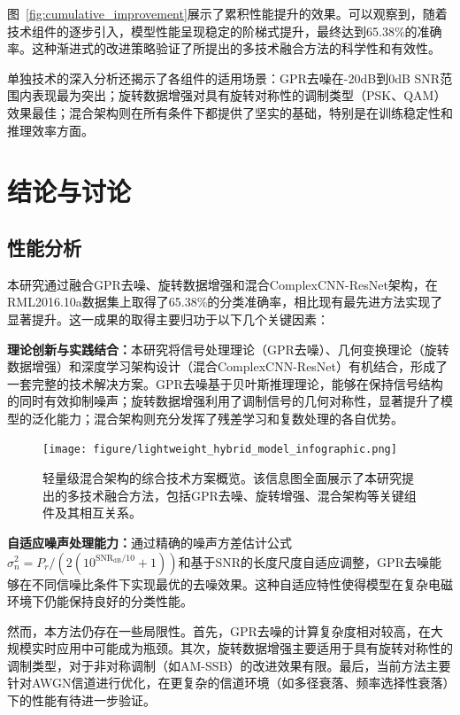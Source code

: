 \documentclass[conference]{IEEEtran}
\begin{document}
图~\ref{fig:cumulative_improvement}展示了累积性能提升的效果。可以观察到，随着技术组件的逐步引入，模型性能呈现稳定的阶梯式提升，最终达到65.38\%的准确率。这种渐进式的改进策略验证了所提出的多技术融合方法的科学性和有效性。

单独技术的深入分析还揭示了各组件的适用场景：GPR去噪在-20dB到0dB SNR范围内表现最为突出；旋转数据增强对具有旋转对称性的调制类型（PSK、QAM）效果最佳；混合架构则在所有条件下都提供了坚实的基础，特别是在训练稳定性和推理效率方面。

\section{结论与讨论}

\subsection{性能分析}

本研究通过融合GPR去噪、旋转数据增强和混合ComplexCNN-ResNet架构，在RML2016.10a数据集上取得了65.38\%的分类准确率，相比现有最先进方法实现了显著提升。这一成果的取得主要归功于以下几个关键因素：

\textbf{理论创新与实践结合：}本研究将信号处理理论（GPR去噪）、几何变换理论（旋转数据增强）和深度学习架构设计（混合ComplexCNN-ResNet）有机结合，形成了一套完整的技术解决方案。GPR去噪基于贝叶斯推理理论，能够在保持信号结构的同时有效抑制噪声；旋转数据增强利用了调制信号的几何对称性，显著提升了模型的泛化能力；混合架构则充分发挥了残差学习和复数处理的各自优势。

\begin{figure}[htbp]
\centering
\texttt{[image: figure/lightweight\_hybrid\_model\_infographic.png]}
\caption{轻量级混合架构的综合技术方案概览。该信息图全面展示了本研究提出的多技术融合方法，包括GPR去噪、旋转增强、混合架构等关键组件及其相互关系。}
\label{fig:comprehensive_overview}
\end{figure}

\textbf{自适应噪声处理能力：}通过精确的噪声方差估计公式$\sigma_n^2 = P_r/(2(10^{\mathrm{SNR}_{\mathrm{dB}}/10} + 1))$和基于SNR的长度尺度自适应调整，GPR去噪能够在不同信噪比条件下实现最优的去噪效果。这种自适应特性使得模型在复杂电磁环境下仍能保持良好的分类性能。

然而，本方法仍存在一些局限性。首先，GPR去噪的计算复杂度相对较高，在大规模实时应用中可能成为瓶颈。其次，旋转数据增强主要适用于具有旋转对称性的调制类型，对于非对称调制（如AM-SSB）的改进效果有限。最后，当前方法主要针对AWGN信道进行优化，在更复杂的信道环境（如多径衰落、频率选择性衰落）下的性能有待进一步验证。
\end{document}
